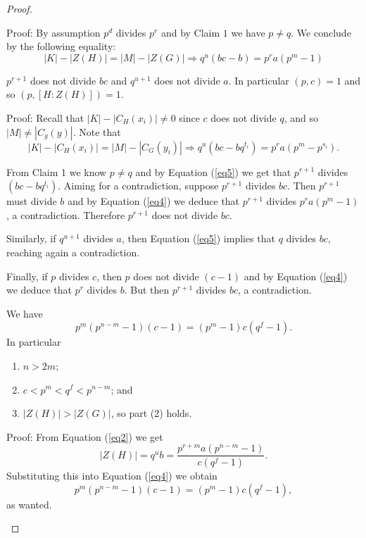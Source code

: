 \documentclass[10pt,a4paper]{amsart}
\begin{document}
\begin{proof}
\begin{description}
\smallskip
\noindent
Proof: 
By assumption $p^d$ divides $p^r$ and by Claim $1$ we have $p\neq q$. We conclude by the following equality:
\begin{equation}\label{eq4} |K| - |Z(H)| = |M| - |Z(G)| 
\Longrightarrow  q^u( bc - b ) = p^ra(p^m - 1)\end{equation}



\bigskip
\item[Claim 3] $p^{r+1}$ does not divide $bc$ and $q^{u+1}$ does not divide $a$. In particular $(p,c)=1$ and so $(p,[H \colon Z(H)])=1$.

\smallskip
\noindent
Proof:  Recall that $|K| - |C_H(x_i)| \neq 0 $ since $c$ does not divide $q$,  and so  $|M| \neq |C_g(y)|$. Note that
\begin{equation}\label{eq5} |K| - |C_H(x_i)| = |M| - |C_G(y_i)| \Longrightarrow 
q^u(bc - bq^{t_i}) = p^ra(p^m - p^{s_i}). \end{equation}


From Claim 1 we know $p\neq q$ and by Equation (\ref{eq5}) we get that $p^{r+1}$ divides $(bc - bq^{t_i})$. 
Aiming for a contradiction, suppose $p^{r+1}$ divides $bc$. Then $p^{r+1}$ must divide $b$ and by Equation (\ref{eq4}) we deduce that $p^{r+1}$ divides $p^ra(p^m-1)$, a contradiction. Therefore $p^{r+1}$ does not divide $bc$.

Similarly, if $q^{u+1}$ divides $a$,  then Equation (\ref{eq5}) implies that $q$ divides $bc$, reaching again a contradiction.

Finally, if $p$ divides $c$, then $p$ does not divide $(c-1)$ and by Equation (\ref{eq4}) we deduce that $p^r$ divides $b$. But then $p^{r+1}$ divides $bc$, a contradiction.


\bigskip
\item[Claim 4] We have
\begin{equation}\label{eqC} p^{m}(p^{n-m}- 1)(c - 1)= (p^{m}- 1)c(q^f - 1).\end{equation} In particular 
\begin{enumerate}
\item $n > 2m$;
\item $c < p^m < q^f < p^{n-m}$; and
\item $|Z(H)| > |Z(G)|$, so part (2) holds.
\end{enumerate}

\smallskip
 \noindent
Proof: From Equation (\ref{eq2}) we get
\[ |Z(H)| = q^ub = \frac{p^{r+m}a(p^{n-m}- 1)}{c(q^f - 1)}.\]
Substituting this into Equation (\ref{eq4}) we obtain
$$ p^{m}(p^{n-m}- 1)(c - 1)= (p^{m}- 1)c(q^f - 1),$$
as wanted.


\end{description}
\end{proof}
\end{document}
